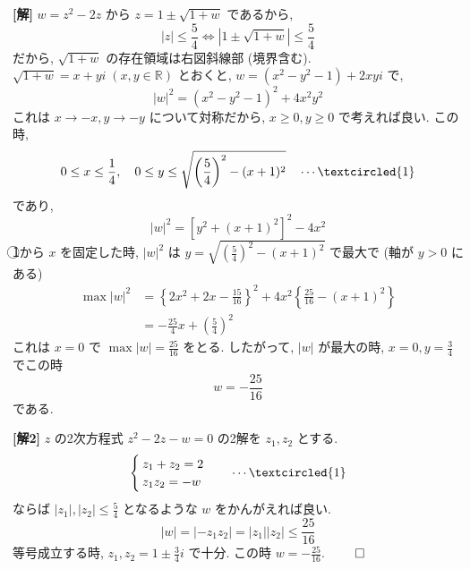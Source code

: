 \documentclass[../main.tex]{subfiles}
\begin{document}
\noindent
\textbf{[解]} $w = z^2 - 2z$ から $z = 1 \pm \sqrt{1+w}$ であるから,
\[
  |z| \le \frac{5}{4} \iff |1 \pm \sqrt{1+w}| \le \frac{5}{4}
\]
だから, $\sqrt{1+w}$ の存在領域は右図斜線部 (境界含む). $\sqrt{1+w} = x + yi \; (x,y \in \mathbb{R})$ とおくと,
$w = (x^2 - y^2 - 1) + 2xy i$ で,
\[
  |w|^2 = (x^2 - y^2 - 1)^2 + 4x^2 y^2
\]
これは $x \to -x, y \to -y$ について対称だから, $x \ge 0, y \ge 0$ で考えれば良い. この時,
\[
  0 \le x \le \frac{1}{4}, \quad 0 \le y \le \sqrt{\left(\frac{5}{4}\right)^2 - (x+1)^2} \quad \cdots \textcircled{1}
\]
であり,
\[
  |w|^2 = [ y^2 + (x+1)^2 ]^2 - 4x^2
\]
\textcircled{1}から $x$ を固定した時, $|w|^2$ は $y = \sqrt{\left(\frac{5}{4}\right)^2 - (x+1)^2}$ で最大で (軸が $y>0$ にある)
\begin{align*}
  \max |w|^2 &= \left\{ 2x^2 + 2x - \frac{15}{16} \right\}^2 + 4x^2 \left\{ \frac{25}{16} - (x+1)^2 \right\} \\
  &= -\frac{25}{4} x + \left(\frac{5}{4}\right)^2
\end{align*}
これは $x=0$ で $\max |w| = \frac{25}{16}$ をとる. したがって, $|w|$ が最大の時, $x=0, y=\frac{3}{4}$ でこの時
\[
  w = -\frac{25}{16}
\]
である.

\begin{center}
\end{center}

\bigskip

\noindent
\textbf{[解2]} $z$ の2次方程式 $z^2 - 2z - w = 0$ の2解を $z_1, z_2$ とする.
\[
  \begin{cases}
    z_1 + z_2 = 2 \\
    z_1 z_2 = -w
  \end{cases} \quad \cdots \textcircled{1}
\]
ならば $|z_1|, |z_2| \le \frac{5}{4}$ となるような $w$ をかんがえれば良い.
\[
  |w| = |-z_1 z_2| = |z_1| |z_2| \le \frac{25}{16}
\]
等号成立する時, $z_1, z_2 = 1 \pm \frac{3}{4}i$ で十分. この時 $w = -\frac{25}{16}$. \hfill $\qed$
\end{document}
